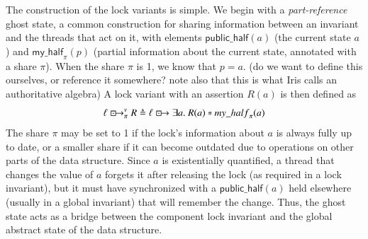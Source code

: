 \documentclass[a4paper,USenglish,cleveref, autoref, thm-restate]{lipics-v2021}
\newcommand{\islock}{\boxdotright}
\newcommand{\lockvar}{\islock^{v}}
\newcommand{\myhalf}[2]{\ensuremath{\mathsf{my\_half}_{#1}(#2)}}
\newcommand{\publichalf}[1]{\ensuremath{\mathsf{public\_half}(#1)}}
\begin{document}
The construction of the lock variants is simple. We begin with a \emph{part-reference} ghost state, a common construction for sharing information between an invariant and the threads that act on it, with elements $\publichalf{a}$ (the current state $a$) and $\myhalf{\pi}{p}$ (partial information about the current state, annotated with a share $\pi$). When the share $\pi$ is 1, we know that $p = a$. (do we want to define this ourselves, or reference it somewhere? note also that this is what Iris calls an authoritative algebra) A lock variant with an assertion $R(a)$ is then defined as %
$$\ell \lockvar_\pi R \triangleq \ell \islock \exists a.\ R(a) * \myhalf{\pi}{a}$$ %
The share $\pi$ may be set to 1 if the lock's information about $a$ is always fully up to date, or a smaller share if it can become outdated due to operations on other parts of the data structure. Since $a$ is existentially quantified, a thread that changes the value of $a$ forgets it after releasing the lock (as required in a lock invariant), but it must have synchronized with a $\publichalf{a}$ held elsewhere (usually in a global invariant) that will remember the change. Thus, the ghost state acts as a bridge between the component lock invariant and the global abstract state of the data structure. %
\end{document}
